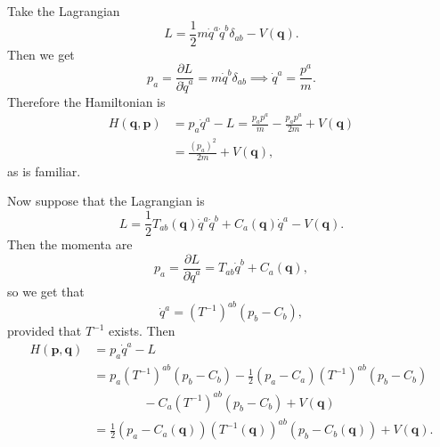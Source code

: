 \documentclass[12pt]{article}
\begin{document}
\begin{exbox}
	Take the Lagrangian
	\[
	L = \frac{1}{2} m \dot q^a \dot q^b \delta_{ab} - V(\mathbf{q}).
	\]
	Then we get
	\[
	p_a = \frac{\partial L}{\partial \dot q^a} = m \dot q^b \delta_{ab} \implies \dot q^a = \frac{p^a}{m}.
	\]
	Therefore the Hamiltonian is
	\begin{align*}
		H(\mathbf{q}, \mathbf{p}) &= p_a \dot q^a - L = \frac{p_a p^a}{m} - \frac{p_a p^a}{2m} + V(\mathbf{q}) \\
					  &= \frac{(p_a)^2}{2m} + V(\mathbf{q}),
	\end{align*}
	as is familiar.

	Now suppose that the Lagrangian is
	\[
	L = \frac{1}{2} T_{ab}(\mathbf{q}) \dot q^a \dot q^b + C_a(\mathbf{q}) \dot q^a - V(\mathbf{q}).
	\]
	Then the momenta are
	\[
	p_a = \frac{\partial L}{\partial \dot q^a} = T_{ab} \dot q^b + C_a(\mathbf{q}),
	\]
	so we get that
	\[
	\dot q^a = (T^{-1})^{ab}(p_b - C_b),
	\]
	provided that $T^{-1}$ exists. Then
	\begin{align*}
		H(\mathbf{p}, \mathbf{q}) &= p_a \dot q^a - L \\
					  &= p_a(T^{-1})^{ab}(p_b - C_b) - \frac{1}{2}(p_a - C_a)(T^{-1})^{ab}(p_b - C_b) \\
					  & \qquad \qquad - C_a(T^{-1})^{ab}(p_b - C_b) + V(\mathbf{q}) \\
					  &= \frac{1}{2}(p_a - C_a(\mathbf{q}))(T^{-1}(\mathbf{q}))^{ab}(p_b - C_b(\mathbf{q})) + V(\mathbf{q}).
	\end{align*}
\end{exbox}

\end{document}
